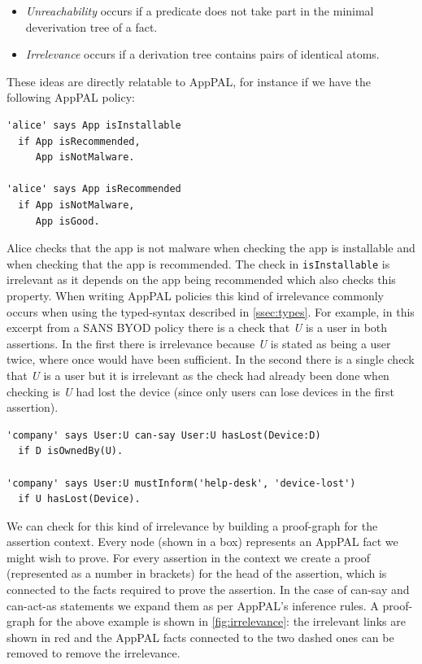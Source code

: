 \documentclass[thesis.tex]{subfiles}
\begin{document}
\begin{itemize}
\item \emph{Unreachability} occurs if a predicate does not take part in the
  minimal deverivation tree of a fact.
\item \emph{Irrelevance} occurs if a derivation tree contains pairs of identical atoms.
\end{itemize}

These ideas are directly relatable to AppPAL, for instance if we have the
following AppPAL policy:

\begin{lstlisting}
'alice' says App isInstallable
  if App isRecommended,
     App isNotMalware.

'alice' says App isRecommended
  if App isNotMalware,
     App isGood.
\end{lstlisting}

Alice checks that the app is not malware when checking the app is
installable and when checking that the app is recommended.  The check
in \texttt{isInstallable} is irrelevant as it depends on the app being
recommended which also checks this property.  When writing AppPAL
policies this kind of irrelevance commonly occurs when using the
typed-syntax described in \autoref{ssec:types}. For example, in this
excerpt from a SANS BYOD policy there is a check that \emph{U} is a
user in both assertions.  In the first there is irrelevance because
\emph{U} is stated as being a user twice, where once would have been
sufficient.  In the second there is a single check that \emph{U} is a
user but it is irrelevant as the check had already been done when
checking is \emph{U} had lost the device (since only users can lose
devices in the first assertion).

\begin{lstlisting}
'company' says User:U can-say User:U hasLost(Device:D)
  if D isOwnedBy(U).

'company' says User:U mustInform('help-desk', 'device-lost')
  if U hasLost(Device).
\end{lstlisting}

We can check for this kind of irrelevance by building a proof-graph for the
assertion context.  Every node (shown in a box) represents an AppPAL fact we
might wish to prove.  For every assertion in the context we create a proof
(represented as a number in brackets) for the head of the assertion, which is
connected to the facts required to prove the assertion.  In the case of can-say
and can-act-as statements we expand them as per AppPAL's inference rules.
A proof-graph for the above example is shown in \autoref{fig:irrelevance}: the
irrelevant links are shown in red and the AppPAL facts connected to the two
dashed ones can be removed to remove the irrelevance.
\end{document}
